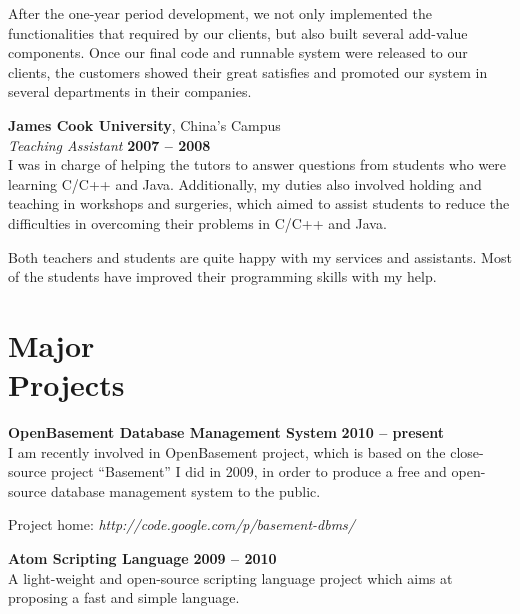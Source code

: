 \documentclass[margin,line]{resume}
\begin{document}
\begin{resume}
    After the one-year period development, we not only implemented the functionalities that required by our clients, but also built several add-value components. Once our final code and runnable system were released to our clients, the customers showed their great satisfies and promoted our system in several departments in their companies.

    \textbf{James Cook University}, China's Campus           \vspace{2mm}\\\vspace{1mm}%
    \textsl{Teaching Assistant} \hfill \textbf{2007 -- 2008} \vspace{2mm}\\\vspace{1mm}%
    I was in charge of helping the tutors to answer questions from students who were learning C/C++ and Java. Additionally, my duties also involved holding and teaching in workshops and surgeries, which aimed to assist students to reduce the difficulties in overcoming their problems in C/C++ and Java.

    Both teachers and students are quite happy with my services and assistants. Most of the students have improved their programming skills with my help.
    
    
    \section{\mysidestyle Major\\Projects}

    \textbf{OpenBasement Database Management System} \hfill \textbf{2010 -- present}\vspace{2mm}\\\vspace{1mm}%
    I am recently involved in OpenBasement project, which is based on the close-source project “Basement” I did in 2009, in order to produce a free and open-source database management system to the public.

    Project home: \textsl{http://code.google.com/p/basement-dbms/}

    \textbf{Atom Scripting Language} \hfill \textbf{2009 -- 2010}\vspace{2mm}\\\vspace{1mm}%
    A light-weight and open-source scripting language project which aims at proposing a fast and simple language.


\end{resume}
\end{document}
